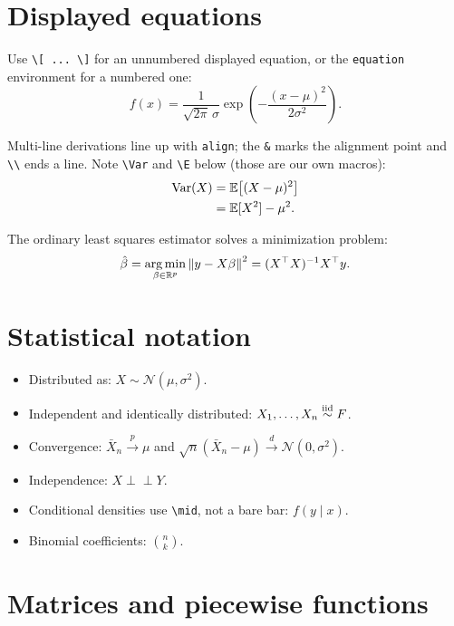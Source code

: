\section{Displayed equations}

Use \verb|\[ ... \]| for an unnumbered displayed equation, or the
\texttt{equation} environment for a numbered one:
\begin{equation}
  f(x) = \frac{1}{\sqrt{2\pi}\,\sigma}
         \exp\!\left( -\frac{(x-\mu)^2}{2\sigma^2} \right).
\end{equation}

Multi-line derivations line up with \texttt{align}; the \texttt{\&} marks the
alignment point and \verb|\\| ends a line.
Note \verb|\Var| and \verb|\E| below (those are our own macros):
\begin{align}
  \operatorname{Var}(X) &= \mathbb{E}\!\left[(X-\mu)^2\right] \\
          &= \mathbb{E}[X^2] - \mu^2 .
\end{align}

The ordinary least squares estimator solves a minimization problem:
\[
  \hat{\beta} = \operatorname*{arg\,min}_{\beta \in \mathbb{R}^p} \left\lVert y - X\beta \right\rVert^2
              = (X^\top X)^{-1} X^\top y .
\]

\section{Statistical notation}

\begin{itemize}
  \item Distributed as: $X \sim \mathcal{N}(\mu, \sigma^2)$.
  \item Independent and identically distributed: $X_1, \ldots, X_n \overset{\text{iid}}{\sim} F$.
  \item Convergence: $\bar{X}_n \xrightarrow{p} \mu$ and
        $\sqrt{n}(\bar{X}_n - \mu) \xrightarrow{d} \mathcal{N}(0, \sigma^2)$.
  \item Independence: $X \perp\!\!\!\perp Y$.
  \item Conditional densities use \verb|\mid|, not a bare bar: $f(y \mid x)$.
  \item Binomial coefficients: $\binom{n}{k}$.
\end{itemize}

\section{Matrices and piecewise functions}

